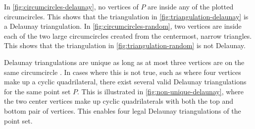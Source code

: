 In \autoref{fig:circumcircles-delaunay}, no vertices of $P$ are inside any of the plotted circumcircles. This shows that the triangulation in \autoref{fig:triangulation-delaunay} is a Delaunay triangulation. In \autoref{fig:circumcircles-random}, two vertices are inside each of the two large circumcircles created from the centermost, narrow triangles. This shows that the triangulation in \autoref{fig:triangulation-random} is not Delaunay.

Delaunay triangulations are unique as long as at most three vertices are on the same circumcircle \cite[Theorem 2.1]{UPR_thesis}. In cases where this is not true, such as where four vertices make up a cyclic quadrilateral, there exist several valid Delaunay triangulations for the same point set $P$. This is illustrated in \autoref{fig:non-unique-delaunay}, where the two center vertices make up cyclic quadrilaterals with both the top and bottom pair of vertices. This enables four legal Delaunay triangulations of the point set.

